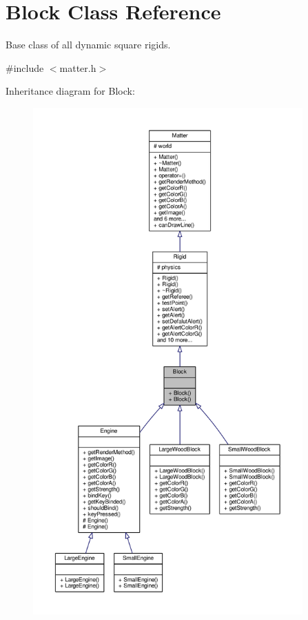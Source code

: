 \hypertarget{classBlock}{}\section{Block Class Reference}
\label{classBlock}


Base class of all dynamic square rigids.  




{\ttfamily \#include $<$matter.\+h$>$}



Inheritance diagram for Block\+:\nopagebreak
\begin{figure}[H]
\begin{center}
\leavevmode
\includegraphics[height=550pt]{classBlock__inherit__graph}
\end{center}
\end{figure}


